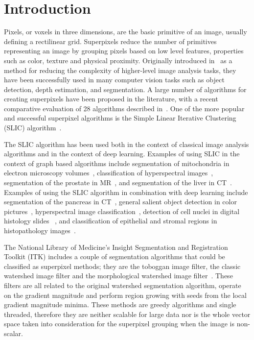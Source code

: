 \documentclass{InsightArticle}
\begin{document}
\tableofcontents


\section{Introduction}

Pixels, or voxels in three dimensions, are the basic primitive of an image,
usually defining a rectilinear grid. Superpixels reduce the number of primitives
representing an image  by grouping pixels based on low level features,
properties such as color, texture and physical proximity. Originally introduced
in~\cite{ren2003} as a method for reducing the complexity of higher-level image analysis tasks,
they have been successfully used in many computer vision tasks such as object
detection, depth estimation, and segmentation. A large number of algorithms for
creating superpixels have been proposed in the literature, with a recent
comparative evaluation of 28 algorithms described
in~\cite{DBLP:journals/cviu/StutzHL18}. One of the more popular and successful
superpixel algorithms is the Simple Linear Iterative Clustering (SLIC)
algorithm~\cite{DBLP:journals/pami/AchantaSSLFS12, lucchi2012}.

The SLIC algorithm has been used both in the context of classical image analysis
algorithms and in the context of deep learning. Examples of using SLIC in the
context of graph based algorithms include segmentation of mitochondria in
electron microscopy volumes~\cite{lucchi2012}, classification of hyperspectral
images~\cite{jia2017}, segmentation of the prostate in MR~\cite{tian2016}, and
segmentation of the liver in CT~\cite{wu2016}. Examples of using the SLIC
algorithm in combination with deep learning include segmentation of the pancreas
in CT~\cite{farag2017}, general salient object detection in color
pictures~\cite{he2015}, hyperspectral image classification~\cite{shi2018},
detection of cell nuclei in digital histology slides ~\cite{sornapudi2018}, and
classification of epithelial and stromal regions in histopathology
images~\cite{xu2016}.

The National Library of Medicine's Insight Segmentation and Registration Toolkit
(ITK) includes a couple of segmentation algorithms that could be classified as
superpixel methods; they are the toboggan image filter, the classic watershed
image filter and the morphological watershed image
filter~\cite{Beare+Lehmann2006}. These filters are all related to the original
watershed segmentation algorithm, operate on the gradient magnitude and perform
region growing with seeds from the local gradient magnitude minima. These
methods are greedy algorithms and single threaded, therefore they are neither
scalable for large data nor is the whole vector space taken into consideration
for the superpixel grouping when the image is non-scalar.
\end{document}
